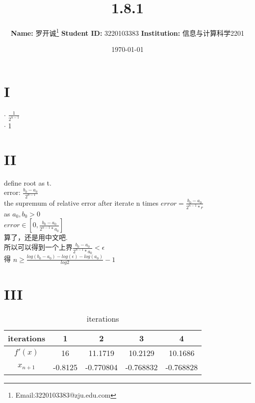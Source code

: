 \documentclass{article}
\title{1.8.1}
\author{
  \textbf{Name:} 罗开诚\footnote{Email:3220103383@zju.edu.com}
  \textbf{Student ID:} 3220103383
  \textbf{Institution:} 信息与计算科学2201 
}
\date{\today}
\begin{document}
\maketitle 

\section*{I}
\begin{flushleft}
\textbf{$\cdot$} $\frac{1}{2^{n-1}}$\\
\textbf{$\cdot$} 1
\end{flushleft}

\section*{II}
\begin{flushleft}
  define root as t.\\
  error:  $\frac{b_0-a_0}{2^{n-1}}$\\
  the supremum of relative error after iterate n times  $error=\frac{b_0-a_0}{2^{n-1}*r}$\\
  as $a_0,b_0>0$\\
      $error \in [0,\frac{b_0-a_0}{2^{n-1}*a_0}]$\\
  算了，还是用中文吧.\\
  所以可以得到一个上界$\frac{b_0-a_0}{2^{n-1}*a_0}<\epsilon$\\
  得    $n \geq \frac{log(b_0-a_0)-log(\epsilon)-log(a_0)}{log 2}-1$

\end{flushleft}

\section*{III}
\begin{flushleft}
  \begin{table}[htbp]
    \centering
    \caption{iterations}
    \begin{tabular}{|c|c|c|c|c|}
    \hline
    iterations & 1 & 2 & 3 & 4 \\ \hline
  \( f'(x) \) & 16 & 11.1719 & 10.2129 & 10.1686 \\ \hline
  \( x_{n+1} \) & -0.8125 & -0.770804 & -0.768832 & -0.768828 \\ \hline
    \end{tabular}
  \end{table}
\end{flushleft}
\end{document}
